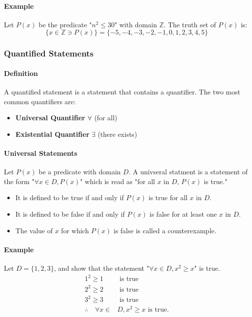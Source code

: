 \paragraph*{Example}
Let $P(x)$ be the predicate "$n^2 \leq 30$" with domain $\mathbb{Z}$. The truth set of $P(x)$ is:
\begin{equation*}
    \{x \in \mathbb{Z} \ni P(x)\} = \{-5, -4, -3, -2, -1, 0, 1, 2, 3, 4, 5\}
\end{equation*}

\subsubsection*{Quantified Statements}
\paragraph*{Definition}
A quantified statement is a statement that contains a quantifier. The two most common quantifiers are:
\begin{itemize}
    \item \textbf{Universal Quantifier} $\forall$ (for all)
    \item \textbf{Existential Quantifier} $\exists$ (there exists)
\end{itemize}

\paragraph*{Universal Statements}
Let $P(x)$ be a predicate with domain $D$. A univseral statment is a statement of the form 
"$\forall x \in D, P(x)$" which is read as "for all $x$ in $D$, $P(x)$ is true."
\begin{itemize}
    \item It is defined to be true if and only if $P(x)$ is true for all $x$ in $D$.
    \item It is defined to be false if and only if $P(x)$ is false for at least one $x$ in $D$.
    \item The value of $x$ for which $P(x)$ is false is called a counterexample.
\end{itemize}

\paragraph*{Example}
Let $D = \{1,2,3\}$, and show that the statement "$\forall x \in D, x^2 \geq x$" is true.
\begin{align*}
    1^2 \geq 1 &\text{ is true}\\
    2^2 \geq 2 &\text{ is true}\\
    3^2 \geq 3 &\text{ is true}\\
    \therefore \quad \forall x \in &D, x^2 \geq x \text{ is true.}
\end{align*}

